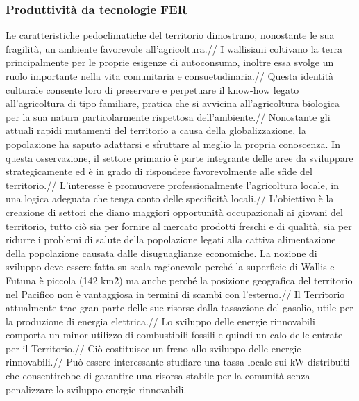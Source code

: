 \documentclass[fleqn,10pt]{SelfArx} %
\begin{document}
\subsubsection{Produttività da tecnologie FER}
Le caratteristiche pedoclimatiche del territorio dimostrano, nonostante le sua fragilità, un ambiente favorevole all'agricoltura.//
I wallisiani coltivano la terra principalmente per le proprie esigenze di autoconsumo, inoltre essa svolge un ruolo importante nella vita comunitaria e consuetudinaria.//
Questa identità culturale consente loro di preservare e perpetuare il know-how legato all'agricoltura di tipo familiare, pratica che si avvicina all'agricoltura biologica per la sua natura particolarmente rispettosa dell'ambiente.//
Nonostante gli attuali rapidi mutamenti del territorio a causa della globalizzazione, la popolazione ha saputo adattarsi e sfruttare al meglio la propria conoscenza. In questa osservazione, il settore primario è parte integrante delle aree da sviluppare strategicamente ed è in grado di rispondere favorevolmente alle sfide del territorio.//
L'interesse è promuovere professionalmente l'agricoltura locale, in una logica adeguata che tenga conto delle specificità locali.//
L'obiettivo è la creazione di settori che diano maggiori opportunità occupazionali ai giovani del territorio, tutto ciò sia per fornire al mercato prodotti freschi e di qualità, sia per ridurre i problemi di salute della popolazione legati alla cattiva alimentazione della popolazione causata dalle disuguaglianze economiche.
La nozione di sviluppo deve essere fatta su scala ragionevole perché la superficie di Wallis e Futuna è piccola (142 km\^2) ma anche perché la posizione geografica del territorio nel Pacifico non è vantaggiosa in termini di scambi con l'esterno.//
Il Territorio attualmente trae gran parte delle sue risorse dalla tassazione del gasolio, utile per la produzione di energia elettrica.//
Lo sviluppo delle energie rinnovabili comporta un minor utilizzo di combustibili fossili e quindi un calo delle entrate per il Territorio.// 
Ciò costituisce un freno allo sviluppo delle energie rinnovabili.//
Può essere interessante studiare una tassa locale sui kW distribuiti che consentirebbe di garantire una risorsa stabile per la comunità senza penalizzare lo sviluppo energie rinnovabili.
\end{document}
